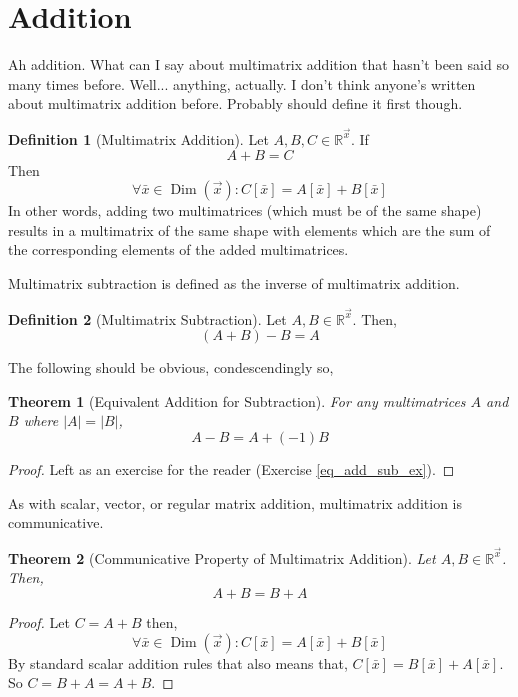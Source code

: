 \documentclass[12pt]{book}
\theoremstyle{plain}
\newtheorem{theorem}{Theorem}[chapter]
\theoremstyle{definition}
\newtheorem{definition}{Definition}[chapter]
\theoremstyle{ppart}
\theoremstyle{case}
\theoremstyle{solution}
\DeclareMathOperator{\Dim}{Dim}
\newcommand{\shape}[1]{\left|#1\right|}
\begin{document}
\section{Addition}

Ah addition. What can I say about multimatrix addition that hasn't been
said so many times before. Well... anything, actually. I don't think anyone's
written about multimatrix addition before. Probably should define it first
though.

\begin{definition}[Multimatrix Addition]
Let $A, B, C \in \mathbb{R}^{\vec{x}}$. If
\[ A + B = C \]
Then
\[ \forall \bar{x} \in \Dim(\vec{x}):
   C[\bar{x}] = A[\bar{x}] + B[\bar{x}] \]
In other words, adding two multimatrices (which must be of the same shape) results
in a multimatrix of the same shape with elements which are the sum of the corresponding
elements of the added multimatrices.
\end{definition}

Multimatrix subtraction is defined as the inverse of multimatrix addition.

\begin{definition}[Multimatrix Subtraction]
Let $A, B \in \mathbb{R}^{\vec{x}}$. Then,
\[ (A + B) - B = A \]
\end{definition}

The following should be obvious, condescendingly so,

\begin{theorem}[Equivalent Addition for Subtraction]
\label{eq_add_sub_thm}
For any multimatrices $A$ and $B$ where $\shape{A} = \shape{B}$,
\[ A - B = A + (-1)B \]
\end{theorem}
\begin{proof}
Left as an exercise for the reader (Exercise \ref{eq_add_sub_ex}).
\end{proof}

As with scalar, vector, or regular matrix addition, multimatrix addition is
communicative. 

\begin{theorem}[Communicative Property of Multimatrix Addition]
Let $A, B \in \mathbb{R}^{\vec{x}}$. Then,
\[ A + B = B + A \]
\end{theorem}
\begin{proof}
Let $C = A + B$ then,
\[ \forall \bar{x} \in \Dim(\vec{x}) : C[\bar{x}] = A[\bar{x}] + B[\bar{x}] \]
By standard scalar addition rules that also means that,
$C[\bar{x}] = B[\bar{x}] + A[\bar{x}]$. So $C = B + A = A + B$.
\end{proof}
\end{document}
